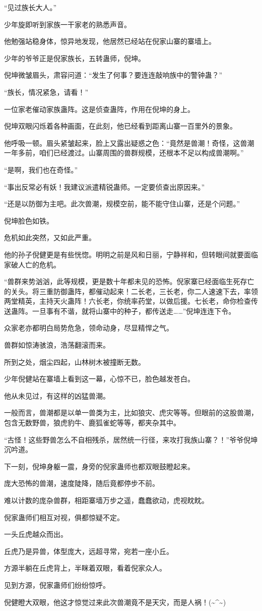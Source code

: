 \begin{this_body}
“见过族长大人。”

少年旋即听到家族一干家老的熟悉声音。

他勉强站稳身体，惊异地发现，他居然已经站在倪家山寨的寨墙上。

少年的爷爷正是倪家族长，五转蛊师，倪坤。

倪坤微皱眉头，肃容问道：“发生了何事？要连连敲响族中的警钟蛊？”

“族长，情况紧急，请看！”

一位家老催动家族蛊阵。这是侦查蛊阵，作用在倪坤的身上。

倪坤双眼闪烁着各种画面，在此刻，他已经看到距离山寨一百里外的景象。

他呼吸一顿。眉头紧皱起来，脸上又露出疑惑之色：“竟然是兽潮！奇怪，这兽潮一年多前，咱们已经渡过。山寨周围的兽群规模，还根本不足以构成兽潮啊。”

“是啊，我们也在奇怪。”

“事出反常必有妖！我建议派遣精锐蛊师。一定要侦查出原因来。”

“还是以防御为主吧。此次兽潮，规模空前，能不能守住山寨，还是个问题。”

倪坤脸色如铁。

危机如此突然，又如此严重。

他的孙子倪健更是有些恍惚。明明之前是风和日丽，宁静祥和，但转眼间就要面临家破人亡的危机。

“兽群来势汹汹，此等规模，更是数十年都未见的恐怖。倪家寨已经面临生死存亡的关头。将三重防御蛊阵，都催动起来！二长老，三长老，你二人速速下去，率领两堂精英，主持天火蛊阵！六长老，你统率药堂，以做后援。七长老，命你检查传送蛊阵。一旦事有不谐，就将山寨中的种子，都传送走……”倪坤连连下令。

众家老亦都明白局势危急，领命动身，尽显精悍之气。

兽群如惊涛骇浪，浩荡翻滚而来。

所到之处，烟尘四起，山林树木被撞断无数。

少年倪健站在寨墙上看到这一幕，心惊不已，脸色越发苍白。

他从未见过，有这样的凶猛兽潮。

一般而言，兽潮都是以单一兽类为主，比如狼灾、虎灾等等。但眼前的这股兽潮，包含无数野兽，狼虎豹牛、鹿狐雀蛇等等，都夹杂其中。

“古怪！这些野兽怎么不自相残杀，居然统一行径，来攻打我族山寨？！”爷爷倪坤沉吟道。

下一刻，倪坤身躯一震，身旁的倪家蛊师也都双眼鼓瞪起来。

庞大恐怖的兽潮，速度陡降，随后竟都停步不前。

难以计数的庞杂兽群，相距寨墙万步之遥，蠢蠢欲动，虎视眈眈。

倪家蛊师们相互对视，俱都惊疑不定。

一头丘虎越众而出。

丘虎乃是异兽，体型庞大，远超寻常，宛若一座小丘。

方源半躺在丘虎背上，半眯着双眼，看着倪家众人。

见到方源，倪家蛊师们纷纷惊呼。

倪健瞪大双眼，他这才惊觉过来此次兽潮竟不是天灾，而是人祸！(\~{}\^{}\~{})

\end{this_body}

